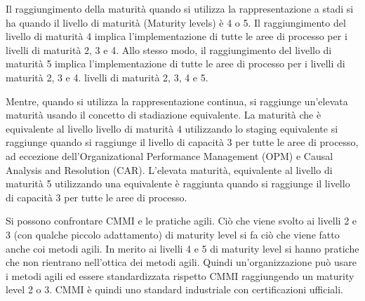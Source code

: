 Il raggiungimento della maturità quando si utilizza la rappresentazione a stadi si ha quando il livello di maturità (Maturity levels) è 4 o 5. Il raggiungimento del livello di maturità 4 implica l'implementazione di tutte le aree di processo per i livelli di maturità 2, 3 e 4. Allo stesso modo, il raggiungimento del livello di maturità 5 implica l'implementazione di tutte le aree di processo per i livelli di maturità 2, 3 e 4. livelli di maturità 2, 3, 4 e 5.

Mentre, quando si utilizza la rappresentazione continua, si raggiunge un'elevata maturità usando il concetto di stadiazione equivalente. La maturità che è equivalente al livello livello di maturità 4 utilizzando lo staging equivalente si raggiunge quando si raggiunge il livello di capacità 3 per tutte le aree di processo, ad eccezione dell'Organizational Performance Management (OPM) e Causal Analysis and Resolution (CAR). L'elevata maturità, equivalente al livello di maturità 5 utilizzando una equivalente è raggiunta quando si raggiunge il livello di capacità 3 per tutte le aree di processo.

Si possono confrontare CMMI e le pratiche agili. Ciò che viene svolto ai livelli 2 e 3 (con qualche piccolo adattamento) di maturity level si fa ciò che viene fatto anche coi metodi agili. In merito ai livelli 4 e 5 di maturity level si hanno pratiche che non rientrano nell'ottica dei metodi agili. Quindi un'organizzazione può usare i metodi agili ed essere standardizzata rispetto CMMI raggiungendo un maturity level 2 o 3. CMMI è quindi uno standard industriale con certificazioni ufficiali.
